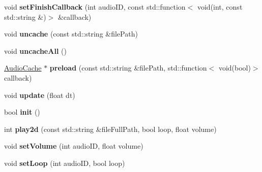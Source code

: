 \begin{DoxyCompactItemize}
void {\bfseries set\+Finish\+Callback} (int audio\+ID, const std\+::function$<$ void(int, const std\+::string \&)$>$ \&callback)
\item 
\mbox{\label{classexperimental_1_1AudioEngineImpl_a4ad8d3d499bf3e5fd262d710b215891e}} 
void {\bfseries uncache} (const std\+::string \&file\+Path)
\item 
\mbox{\label{classexperimental_1_1AudioEngineImpl_ae439dacc5acebf311686ebf6f1f6b3df}} 
void {\bfseries uncache\+All} ()
\item 
\mbox{\label{classexperimental_1_1AudioEngineImpl_a220cb2755bcaa7d4ae17e2740a9abf8c}} 
\hyperlink{classexperimental_1_1AudioCache}{Audio\+Cache} $\ast$ {\bfseries preload} (const std\+::string \&file\+Path, std\+::function$<$ void(bool)$>$ callback)
\item 
\mbox{\label{classexperimental_1_1AudioEngineImpl_a0aa9187ac5e5341a505cf6154feceaee}} 
void {\bfseries update} (float dt)
\item 
\mbox{\label{classexperimental_1_1AudioEngineImpl_a908e5136201a8a6b53ae5c292329f82b}} 
bool {\bfseries init} ()
\item 
\mbox{\label{classexperimental_1_1AudioEngineImpl_a04b788a8319f5d7f90e297a2a345f745}} 
int {\bfseries play2d} (const std\+::string \&file\+Full\+Path, bool loop, float volume)
\item 
\mbox{\label{classexperimental_1_1AudioEngineImpl_aaa11ae7fe8bfd4c4365c02aa71f119b0}} 
void {\bfseries set\+Volume} (int audio\+ID, float volume)
\item 
\mbox{\label{classexperimental_1_1AudioEngineImpl_afd6600a03fa747d44c79f09fbc41b373}} 
void {\bfseries set\+Loop} (int audio\+ID, bool loop)
\item 
\mbox{\label{classexperimental_1_1AudioEngineImpl_a4b7cd4c0f622f263dee4f8067cc364a1}} 

\end{DoxyCompactItemize}
